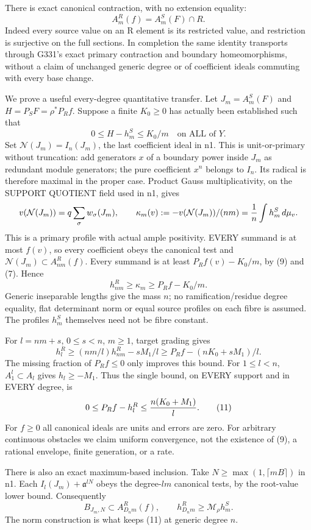 \documentclass[11pt]{article}
\begin{document}
There is exact canonical contraction, with no extension equality:
\[
           A_m^R(f)=A_m^S(F)\cap R.                        \tag{8}
\]
Indeed every source value on an R element is its restricted value, and
restriction is surjective on the full sections. In completion the same
identity transports through G331's exact primary contraction and
boundary homeomorphisms, without a claim of unchanged generic degree or
of coefficient ideals commuting with every base change.

We prove a useful every-degree quantitative transfer. Let
$J_m=A_m^S(F)$ and $H=P_SF=\rho^*P_Rf$. Suppose a finite $K_0\ge0$
has actually been established such that
\[
        0\le H-h_m^S\le K_0/m \quad\text{on ALL of }Y.      \tag{9}
\]
Set $\mathcal N(J_m)=I_n(J_m)$, the last coefficient ideal in n1.
This is unit-or-primary without truncation: add generators $x$ of a
boundary power inside $J_m$ as redundant module generators; the pure
coefficient $x^n$ belongs to $I_n$. Its radical is therefore maximal
in the proper case. Product Gauss multiplicativity, on the SUPPORT
QUOTIENT field used in n1, gives
\[
 v(\mathcal N(J_m))=q\sum_{\sigma}w_\sigma(J_m),\qquad
 \kappa_m(v):=-v(\mathcal N(J_m))/(nm)
             ={1\over n}\int h_m^S\,d\mu_v.
\]
This is a primary profile with actual ample positivity. EVERY summand
is at most $f(v)$, so every coefficient obeys the canonical test and
$\mathcal N(J_m)\subset A_{nm}^R(f)$. Every summand is at least
$P_Rf(v)-K_0/m$, by (9) and (7). Hence
\[
        h_{nm}^R\ge\kappa_m\ge P_Rf-K_0/m.                 \tag{10}
\]
Generic inseparable lengths give the mass $n$; no ramification/residue
degree equality, flat determinant norm or equal source profiles on each
fibre is assumed. The profiles $h_m^S$ themselves need not be fibre
constant.

For $l=nm+s$, $0\le s<n$, $m\ge1$, target grading gives
\[
 h_l^R\ge (nm/l)h_{nm}^R-sM_1/l
       \ge P_Rf-(nK_0+sM_1)/l.
\]
The missing fraction of $P_Rf\le0$ only improves this bound.
For $1\le l<n$, $A_1^l\subset A_l$ gives $h_l\ge-M_1$.
Thus the single bound, on EVERY support and in EVERY degree, is
\[
           0\le P_Rf-h_l^R\le {n(K_0+M_1)\over l}.         \tag{11}
\]
For $f\ge0$ all canonical ideals are units and errors are zero.
For arbitrary continuous obstacles we claim uniform convergence, not
the existence of (9), a rational envelope, finite generation, or a rate.

There is also an exact maximum-based inclusion. Take
$N\ge\max(1,\lceil mB\rceil)$ in n1. Each
$I_l(J_m)+\mathfrak a^{lN}$ obeys the degree-$lm$ canonical tests,
by the root-value lower bound. Consequently
\[
 B_{J_m,N}\subset A_{D_nm}^R(f),\qquad
 h_{D_nm}^R\ge\mathcal M_\rho h_m^S.
\]
The norm construction is what keeps (11) at generic degree $n$.
\end{document}
